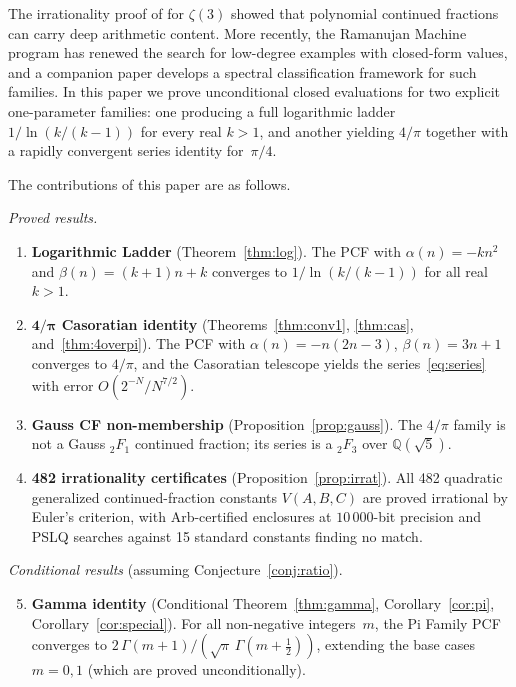 \documentclass[11pt,a4paper]{article}
\theoremstyle{plain}
\theoremstyle{definition}
\theoremstyle{remark}
\begin{document}
The irrationality proof of \citet{apery1979} for $\zeta(3)$ showed
that polynomial continued fractions can carry deep arithmetic content.
More recently, the Ramanujan Machine program
\citep{raayoni2021,elimelech2024} has renewed the search for
low-degree examples with closed-form values, and a companion paper
\citep{papanokechi2026spectral} develops a spectral classification
framework for such families.
In this paper we prove unconditional closed evaluations for two
explicit one-parameter families: one producing a full logarithmic
ladder $1/\ln(k/(k{-}1))$ for every real $k > 1$, and another
yielding $4/\pi$ together with a rapidly convergent series identity
for~$\pi/4$.


The contributions of this paper are as follows.

\medskip
\noindent\textit{Proved results.}
\begin{enumerate}
\item \textbf{Logarithmic Ladder} (Theorem~\ref{thm:log}).
  The PCF with $\alpha(n) = -kn^2$ and $\beta(n) = (k{+}1)n + k$
  converges to $1/\ln(k/(k{-}1))$ for all real $k > 1$.
\item \textbf{$\boldsymbol{4/\pi}$ Casoratian identity}
  (Theorems~\ref{thm:conv1}, \ref{thm:cas}, and~\ref{thm:4overpi}).
  The PCF with $\alpha(n) = -n(2n{-}3)$, $\beta(n) = 3n{+}1$
  converges to $4/\pi$, and the Casoratian telescope yields the
  series~\eqref{eq:series} with error $O(2^{-N}/N^{7/2})$.
\item \textbf{Gauss CF non-membership} (Proposition~\ref{prop:gauss}).
  The $4/\pi$ family is not a Gauss ${}_2F_1$ continued fraction;
  its series is a ${}_2F_3$ over $\mathbb{Q}(\sqrt{5})$.
\item \textbf{482 irrationality certificates}
  (Proposition~\ref{prop:irrat}).
  All 482 quadratic generalized continued-fraction constants
  $V(A,B,C)$ are proved irrational by Euler's criterion,
  with Arb-certified enclosures at $10\,000$-bit precision
  and PSLQ searches against 15 standard constants finding no match.
\end{enumerate}

\noindent\textit{Conditional results} (assuming
Conjecture~\ref{conj:ratio}).
\begin{enumerate}
\setcounter{enumi}{4}
\item \textbf{Gamma identity}
  (Conditional Theorem~\ref{thm:gamma},
   Corollary~\ref{cor:pi},
   Corollary~\ref{cor:special}).
  For all non-negative integers~$m$, the Pi Family PCF converges to
  $2\,\Gamma(m{+}1)/(\sqrt{\pi}\,\Gamma(m{+}\frac{1}{2}))$,
  extending the base cases $m = 0,1$ (which are proved unconditionally).
\end{enumerate}
\end{document}

